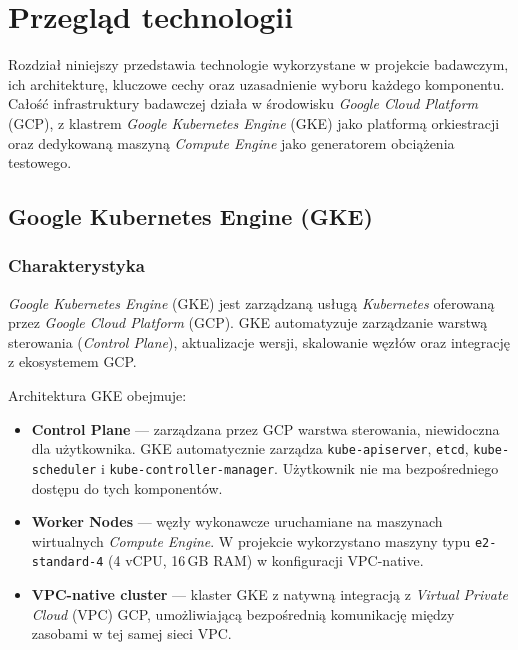 \chapter{Przegląd technologii}

Rozdział niniejszy przedstawia technologie wykorzystane w projekcie badawczym, ich architekturę, kluczowe cechy oraz uzasadnienie wyboru każdego komponentu. Całość infrastruktury badawczej działa w środowisku \textit{Google Cloud Platform} (GCP), z klastrem \textit{Google Kubernetes Engine} (GKE) jako platformą orkiestracji oraz dedykowaną maszyną \textit{Compute Engine} jako generatorem obciążenia testowego.

\section{Google Kubernetes Engine (GKE)}

\subsection{Charakterystyka}

\textit{Google Kubernetes Engine} (GKE) jest zarządzaną usługą \textit{Kubernetes} oferowaną przez \textit{Google Cloud Platform} (GCP). GKE automatyzuje zarządzanie warstwą sterowania (\textit{Control Plane}), aktualizacje wersji, skalowanie węzłów oraz integrację z ekosystemem GCP.

Architektura GKE obejmuje:

\begin{itemize}
  \item \textbf{Control Plane} — zarządzana przez GCP warstwa sterowania, niewidoczna dla użytkownika. GKE automatycznie zarządza \texttt{kube-apiserver}, \texttt{etcd}, \texttt{kube-scheduler} i \texttt{kube-controller-manager}. Użytkownik nie ma bezpośredniego dostępu do tych komponentów.
  \item \textbf{Worker Nodes} — węzły wykonawcze uruchamiane na maszynach wirtualnych \textit{Compute Engine}. W projekcie wykorzystano maszyny typu \texttt{e2-standard-4} (4 vCPU, 16\,GB RAM) w konfiguracji VPC-native.
  \item \textbf{VPC-native cluster} — klaster GKE z natywną integracją z \textit{Virtual Private Cloud} (VPC) GCP, umożliwiającą bezpośrednią komunikację między zasobami w tej samej sieci VPC.
\end{itemize}

